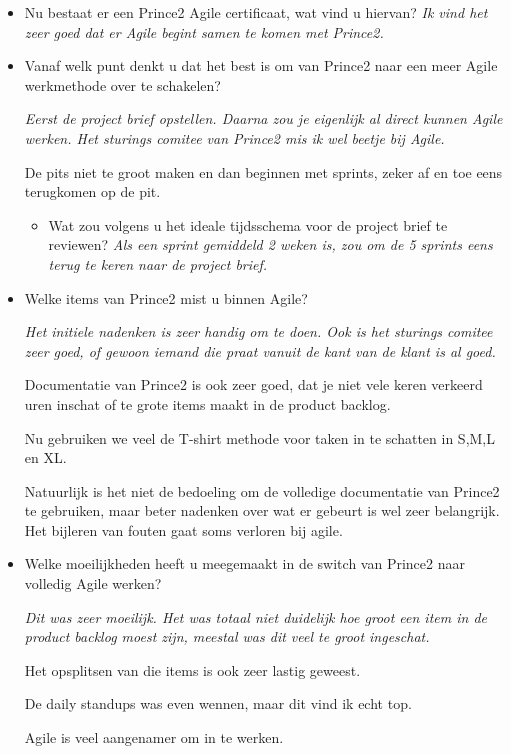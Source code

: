 \documentclass[]{article}
\begin{document}
\begin{itemize}
{		Iets willen inwerken die niet staat in de project brief is iets dat niet gebeurd.
		
		Een combinatie tussen Prince2 en Agile lijkt me wel zeer goed.
	}
	\item Nu bestaat er een Prince2 Agile certificaat, wat vind u hiervan?
	{\it 
		Ik vind het zeer goed dat er Agile begint samen te komen met Prince2.
	}
	\item Vanaf welk punt denkt u dat het best is om van Prince2 naar een meer Agile werkmethode over te schakelen?
	{\it 
		Eerst de project brief opstellen. Daarna zou je eigenlijk al direct kunnen Agile werken. Het sturings comitee van Prince2 mis ik wel beetje bij Agile. 
		
		De pits niet te groot maken en dan beginnen met sprints, zeker af en toe eens terugkomen op de pit.
	}
	\begin{itemize}
		\item Wat zou volgens u het ideale tijdsschema voor de project brief te reviewen?
		{\it 
			Als een sprint gemiddeld 2 weken is, zou om de 5 sprints eens terug te keren naar de project brief.
		}
	\end{itemize}
	\item Welke items van Prince2 mist u binnen Agile?
	{\it 
		Het initiele nadenken is zeer handig om te doen. Ook is het sturings comitee zeer goed, of gewoon iemand die praat vanuit de kant van de klant is al goed.
		
		Documentatie van Prince2 is ook zeer goed, dat je niet vele keren verkeerd uren inschat of te grote items maakt in de product backlog.
		
		Nu gebruiken we veel de T-shirt methode voor taken in te schatten in S,M,L en XL. 
		
		Natuurlijk is het niet de bedoeling om de volledige documentatie van Prince2 te gebruiken, maar beter nadenken over wat er gebeurt is wel zeer belangrijk. Het bijleren van fouten gaat soms verloren bij agile.
	}
	\item Welke moeilijkheden heeft u meegemaakt in de switch van Prince2 naar volledig Agile werken?
	{\it 
		Dit was zeer moeilijk. Het was totaal niet duidelijk hoe groot een item in de product backlog moest zijn, meestal was dit veel te groot ingeschat.
		
		Het opsplitsen van die items is ook zeer lastig geweest.
		
		De daily standups was even wennen, maar dit vind ik echt top.
		
		Agile is veel aangenamer om in te werken.
	}
	 

\end{itemize}
\end{document}
